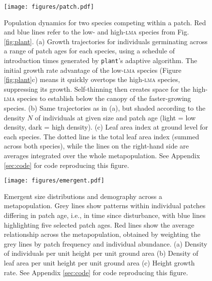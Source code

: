 \documentclass[a4paper,11pt]{article}
\newcommand{\plant}{\texttt{plant}}
\begin{document}
\newpage

\begin{figure}[h!]
\centering
\texttt{[image: figures/patch.pdf]}
\caption{Population dynamics for two species competing within a patch.
 Red and blue lines refer to the low- and high-\textsc{lma} species from
 Fig. \ref{fig:plant}. (a) Growth trajectories
 for individuals germinating across a range of patch ages for each
 species, using a schedule of introduction times generated by
 {\plant}'s adaptive algorithm. The initial growth rate advantage of
 the low-\textsc{lma} species (Figure \ref{fig:plant}c) means it
 quickly overtops the high-\textsc{lma} species, suppressing its
 growth. Self-thinning then creates space for the high-\textsc{lma}
 species to establish below the canopy of the faster-growing species.
 (b) Same trajectories as in (a), but shaded
 according to the density $N$ of individuals at given size and patch
 age (light = low density, dark = high density). (c) Leaf area
 index at ground level for each species. The dotted line is the
 total leaf area index (summed across both species), while the lines on
 the right-hand side are averages integrated over the whole
 metapopulation. See Appendix \ref{sec:code} for code
 reproducing this figure.}
\label{fig:patch}
\end{figure}

\newpage

\begin{figure}[h!]
\centering
\texttt{[image: figures/emergent.pdf]}
\caption{Emergent size distributions and demography across a metapopulation.
Grey lines show patterns within individual patches differing in patch age, i.e., in time
since disturbance, with blue lines highlighting five selected
patch ages. Red lines show the average relationship across the metapopulation,
obtained by weighting the grey lines by patch frequency and individual abundance.
(a) Density of individuals per unit height per unit ground area (b) Density of leaf area
per unit height per unit ground area (c) Height growth rate.
See Appendix \ref{sec:code} for code reproducing this figure.}
\label{fig:emergent}
\end{figure}

\newpage
\end{document}
